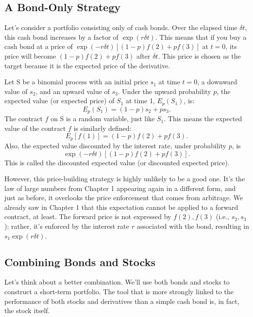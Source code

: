 \documentclass[uplatex,a4j,12pt,dvipdfmx]{jsarticle}
\begin{document}
\subsection{A Bond-Only Strategy}
Let's consider a portfolio consisting only of cash bonds. Over the elapsed time $\delta t$, this cash bond increases by a factor of $\exp(r\delta t)$. This means that if you buy a cash bond at a price of $\exp(- r\delta t)[(1-p)f(2) + pf(3)]$ at $t=0$, its price will become $(1-p)f(2) + pf(3)$ after $\delta t$. This price is chosen as the target because it is the expected price of the derivative.

Let S be a binomial process with an initial price $s_1$ at time $t=0$, a downward value of $s_2$, and an upward value of $s_3$. Under the upward probability $p$, the expected value (or expected price) of $S_1$ at time 1, $E_p(S_1)$, is:
\[E_p(S_1) = (1-p)s_2 + ps_3.\]
The contract $f$ on S is a random variable, just like $S_1$. This means the expected value of the contract $f$ is similarly defined:
\[E_p[f(1)] = (1-p)f(2) + pf(3).\]
Also, the expected value discounted by the interest rate, under probability $p$, is \[\exp(-r\delta t)[(1-p)f(2) + pf(3)].\] This is called the discounted expected value (or discounted expected price).

However, this price-building strategy is highly unlikely to be a good one. It's the law of large numbers from Chapter 1 appearing again in a different form, and just as before, it overlooks the price enforcement that comes from arbitrage. We already saw in Chapter 1 that this expectation cannot be applied to a forward contract, at least. The forward price is not expressed by $f(2), f(3)$ (i.e., $s_2, s_3$); rather, it's enforced by the interest rate $r$ associated with the bond, resulting in $s_1 \exp(r\delta t)$.

\subsection{Combining Bonds and Stocks}
Let's think about a better combination. We'll use both bonds and stocks to construct a short-term portfolio. The tool that is more strongly linked to the performance of both stocks and derivatives than a simple cash bond is, in fact, the stock itself.
\end{document}
